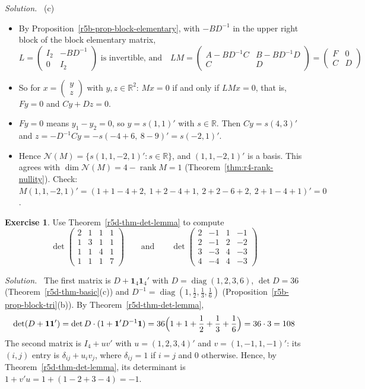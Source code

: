 \documentclass[12pt]{article}
\newcommand{\R}{\mathbb R}
\newcommand{\one}{\mathbf 1}
\DeclareMathOperator{\diag}{diag}
\DeclareMathOperator{\rank}{rank}
\theoremstyle{definition}
\newtheorem{exercise}{Exercise}
\newenvironment{solution}{\par\noindent\textit{Solution.}\ }{\par\smallskip}
\begin{document}
\begin{solution}
(c)
\begin{itemize}
\item By Proposition~\ref{r5b-prop-block-elementary}, with \(-BD^{-1}\) in the upper right block of the block
elementary matrix,
\[
L=\begin{pmatrix}I_2&-BD^{-1}\\0&I_2\end{pmatrix}\text{ is invertible, and}\quad
LM=\begin{pmatrix}A-BD^{-1}C&B-BD^{-1}D\\C&D\end{pmatrix}=\begin{pmatrix}F&0\\C&D\end{pmatrix}
\]
\item So for \(x=\left(\begin{smallmatrix}y\\z\end{smallmatrix}\right)\) with \(y,z\in\R^2\): \(Mx=0\) if and only if
\(LMx=0\), that is, \(Fy=0\) and \(Cy+Dz=0\).
\item \(Fy=0\) means \(y_1-y_2=0\), so \(y=s(1,1)'\) with \(s\in\R\). Then \(Cy=s(4,3)'\) and
\(z=-D^{-1}Cy=-s(-4+6,\ 8-9)'=s(-2,1)'\).
\item Hence \(\mathcal N(M)=\{s(1,1,-2,1)':s\in\R\}\), and \((1,1,-2,1)'\) is a basis. This agrees with
\(\dim\mathcal N(M)=4-\rank M=1\) (Theorem~\ref{thm:r4-rank-nullity}). Check:
\(M(1,1,-2,1)'=(1+1-4+2,\ 1+2-4+1,\ 2+2-6+2,\ 2+1-4+1)'=0\).
\end{itemize}
\end{solution}

\begin{exercise}\label{r5d-ex-det-lemma}
Use Theorem~\ref{r5d-thm-det-lemma} to compute
\[
\det\begin{pmatrix}2&1&1&1\\1&3&1&1\\1&1&4&1\\1&1&1&7\end{pmatrix}\qquad\text{and}\qquad
\det\begin{pmatrix}2&-1&1&-1\\2&-1&2&-2\\3&-3&4&-3\\4&-4&4&-3\end{pmatrix}
\]
\end{exercise}
\begin{solution}
The first matrix is \(D+\one_4\one_4'\) with \(D=\diag(1,2,3,6)\), \(\det D=36\) (Theorem~\ref{r5d-thm-basic}(c)) and
\(D^{-1}=\diag(1,\frac12,\frac13,\frac16)\) (Proposition~\ref{r5b-prop-block-tri}(b)). By
Theorem~\ref{r5d-thm-det-lemma},
\[
\det(D+\one\one')=\det D\cdot(1+\one'D^{-1}\one)=36\Bigl(1+1+\frac12+\frac13+\frac16\Bigr)=36\cdot3=108
\]
The second matrix is \(I_4+uv'\) with \(u=(1,2,3,4)'\) and \(v=(1,-1,1,-1)'\): its \((i,j)\) entry
is \(\delta_{ij}+u_iv_j\), where \(\delta_{ij}=1\) if \(i=j\) and \(0\) otherwise. Hence, by
Theorem~\ref{r5d-thm-det-lemma}, its determinant is \(1+v'u=1+(1-2+3-4)=-1\).
\end{solution}
\end{document}
